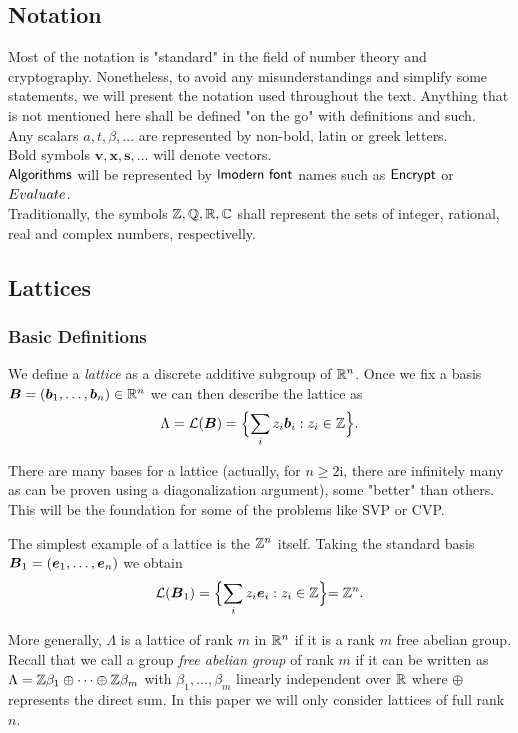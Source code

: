 \subsection{Notation}
Most of the notation is "standard" in the field of number theory and cryptography. Nonetheless, to avoid any misunderstandings and simplify some statements, we will present the notation used throughout the text. Anything that is not mentioned here shall be defined "on the go" with definitions and such. \\

\noindent Any scalars $a, t, \beta, \dots$ are represented by non-bold, latin or greek letters.\\
Bold symbols $\bm{v}, \bm{x}, \bm{s}, \dots$ will denote vectors. \\
$\alg{Algorithms}$ will be represented by $\alg{lmodern font}$ names such as $\alg{Encrypt}$ or ${\fontfamily{lmss}\selectfont Evaluate}$.\\
Traditionally, the symbols $\mathbb{Z}, \mathbb{Q}, \mathbb{R}, \mathbb{C}$ shall represent the sets of integer, rational, real and complex numbers, respectivelly.

\subsection{Lattices}
\subsubsection*{Basic Definitions}
We define a \textit{lattice} as a discrete additive subgroup of $\mathbb{R}^n$. Once we fix a basis $\boldsymbol{B} = (\boldsymbol{b}_1, \dots ,\boldsymbol{b}_n) \in \mathbb{R}^n$ we can then describe the lattice as
$$ \Lambda = \mathcal{L}(\boldsymbol{B}) = \Bigl\{ \sum_i z_i \boldsymbol{b}_i : z_i \in \mathbb{Z} \Bigl\}.$$

There are many bases for a lattice (actually, for $n \geq 2$i, there are infinitely many as can be proven using a diagonalization argument), some "better" than others. This will be the foundation for some of the problems like SVP or CVP.

\begin{example}
    The simplest example of a lattice is the $\mathbb{Z}^n$ itself. Taking the standard basis $\boldsymbol{B}_1 = (\boldsymbol{e}_1, \dots, \boldsymbol{e}_n)$ we obtain
$$\mathcal{L}(\boldsymbol{B}_1) = \Bigl\{ \sum_i z_i \boldsymbol{e}_i : z_i \in \mathbb{Z} \Bigl\} = \mathbb{Z}^n.$$
\end{example}
More generally, $\Lambda$ is a lattice of rank $m$ in $\mathbb{R}^n$ if it is a rank $m$ free abelian group. Recall that we call a group \textit{free abelian group} of rank $m$ if it can be written as $\Lambda = \mathbb{Z}\beta_1 \oplus \cdots \oplus\mathbb{Z}\beta_m$ with $\beta_1, \dots, \beta_m$ linearly independent over $\mathbb{R}$ where $\oplus$ represents the direct sum. In this paper we will only consider lattices of full rank $n$. 

